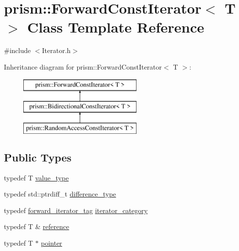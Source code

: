 \hypertarget{classprism_1_1_forward_const_iterator}{}\section{prism\+:\+:Forward\+Const\+Iterator$<$ T $>$ Class Template Reference}
\label{classprism_1_1_forward_const_iterator}


{\ttfamily \#include $<$Iterator.\+h$>$}

Inheritance diagram for prism\+:\+:Forward\+Const\+Iterator$<$ T $>$\+:\begin{figure}[H]
\begin{center}
\leavevmode
\includegraphics[height=3.000000cm]{classprism_1_1_forward_const_iterator}
\end{center}
\end{figure}
\subsection*{Public Types}
\begin{DoxyCompactItemize}
\item 
typedef T \hyperlink{classprism_1_1_forward_const_iterator_a958f1a35f6cfa5698b7166990f582872}{value\+\_\+type}
\item 
typedef std\+::ptrdiff\+\_\+t \hyperlink{classprism_1_1_forward_const_iterator_ae2a7ad4082065395bff5ac5b724d4b6f}{difference\+\_\+type}
\item 
typedef \hyperlink{structprism_1_1forward__iterator__tag}{forward\+\_\+iterator\+\_\+tag} \hyperlink{classprism_1_1_forward_const_iterator_afee4cf1bb0fff922f00d6802c6db9974}{iterator\+\_\+category}
\item 
typedef T \& \hyperlink{classprism_1_1_forward_const_iterator_a839eeb121503b031260ad21ef844dd9a}{reference}
\item 
typedef T $\ast$ \hyperlink{classprism_1_1_forward_const_iterator_a6e4e245d3ab99d6e9b237abe2c0c06d8}{pointer}
\end{DoxyCompactItemize}
